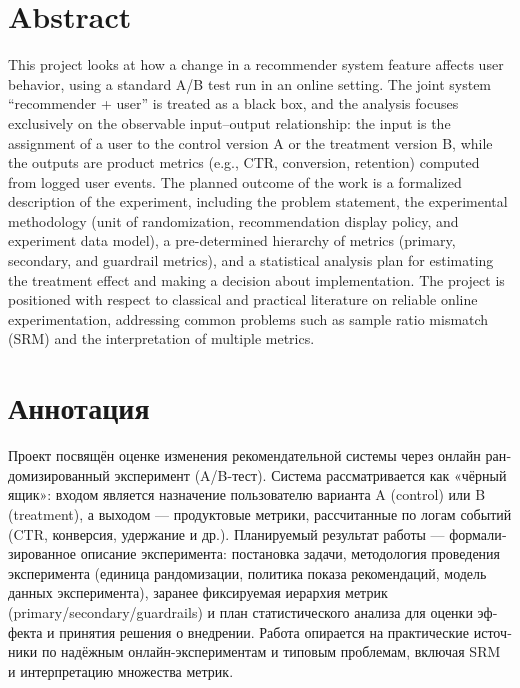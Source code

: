 \documentclass[a4paper,12pt]{extarticle}
\numberwithin{equation}{section}
\begin{document}

\clearpage

\setcounter{page}{2}

{
  \hypersetup{linkcolor=black}
  \tableofcontents
}
\clearpage

\section*{Abstract}
This project looks at how a change in a recommender system feature affects user behavior, using
a standard A/B test run in an online setting. The joint system
``recommender + user'' is treated as a black box, and the analysis focuses
exclusively on the observable input--output relationship: the input is the
assignment of a user to the control version A or the treatment version B, while
the outputs are product metrics (e.g., CTR, conversion, retention) computed from
logged user events. The planned outcome of the work is a formalized description
of the experiment, including the problem statement, the experimental methodology
(unit of randomization, recommendation display policy, and experiment data
model), a pre-determined hierarchy of metrics (primary, secondary, and guardrail
metrics), and a statistical analysis plan for estimating the treatment effect
and making a decision about implementation. The project is positioned with
respect to classical and practical literature on reliable online
experimentation, addressing common problems such as sample ratio mismatch
(SRM) and the interpretation of multiple metrics.

\section*{Аннотация}
\begin{otherlanguage}{russian}
Проект посвящён оценке изменения рекомендательной системы через онлайн
рандомизированный эксперимент (A/B-тест). Система рассматривается как «чёрный
ящик»: входом является назначение пользователю варианта A (control) или B
(treatment), а выходом — продуктовые метрики, рассчитанные по логам событий
(CTR, конверсия, удержание и др.). Планируемый результат работы —
формализированное описание эксперимента: постановка задачи, методология
проведения эксперимента (единица рандомизации, политика показа рекомендаций,
модель данных эксперимента), заранее фиксируемая иерархия метрик
(primary/secondary/guardrails) и план статистического анализа для оценки эффекта
и принятия решения о внедрении. Работа опирается на практические источники по
надёжным онлайн-экспериментам и типовым проблемам, включая SRM и интерпретацию
множества метрик.
\end{otherlanguage}
\end{document}
